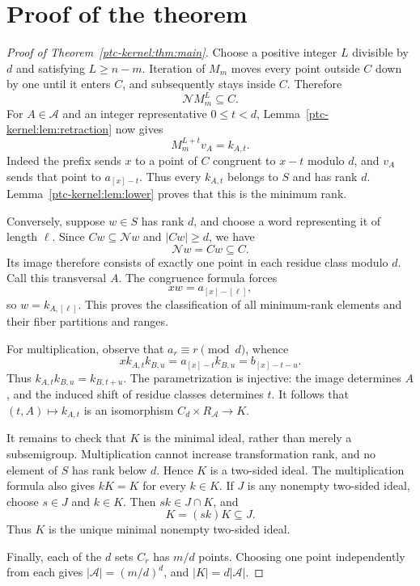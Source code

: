 
\section{Proof of the theorem}
\begin{proof}[Proof of Theorem~\ref{ptc-kernel:thm:main}]
Choose a positive integer $L$ divisible by $d$ and satisfying $L\ge n-m$.
Iteration of $M_m$ moves every point outside $C$ down by one until it
enters $C$, and subsequently stays inside $C$. Therefore
\[
 \mathcal N M_m^L\subseteq C.
\]
For $A\in\mathcal A$ and an integer representative $0\le t<d$,
Lemma~\ref{ptc-kernel:lem:retraction} now gives
\[
 M_m^{L+t}v_A=k_{A,t}.
\]
Indeed the prefix sends $x$ to a point of $C$ congruent to $x-t$
modulo $d$, and $v_A$ sends that point to $a_{[x]-t}$.
Thus every $k_{A,t}$ belongs to $S$ and has rank $d$.
Lemma~\ref{ptc-kernel:lem:lower} proves that this is the minimum rank.

Conversely, suppose $w\in S$ has rank $d$, and choose a word
representing it of length $\ell$. Since $Cw\subseteq\mathcal Nw$ and
$|Cw|\ge d$, we have
\[
 \mathcal Nw=Cw\subseteq C.
\]
Its image therefore consists of exactly one point in each residue
class modulo $d$. Call this transversal $A$. The congruence formula
forces
\[
 xw=a_{[x]-[\ell]},
\]
so $w=k_{A,[\ell]}$. This proves the classification of all minimum-rank
elements and their fiber partitions and ranges.

For multiplication, observe that $a_r\equiv r\pmod d$, whence
\[
 xk_{A,t}k_{B,u}=a_{[x]-t}k_{B,u}=b_{[x]-t-u}.
\]
Thus $k_{A,t}k_{B,u}=k_{B,t+u}$. The parametrization is injective:
the image determines $A$, and the induced shift of residue classes
determines $t$. It follows that $(t,A)\mapsto k_{A,t}$ is an
isomorphism $C_d\times R_{\mathcal A}\to K$.

It remains to check that $K$ is the minimal ideal, rather than merely
a subsemigroup. Multiplication cannot increase transformation rank,
and no element of $S$ has rank below $d$. Hence $K$ is a two-sided
ideal. The multiplication formula also gives $kK=K$ for every $k\in K$.
If $J$ is any nonempty two-sided ideal, choose $s\in J$ and $k\in K$.
Then $sk\in J\cap K$, and
\[
 K=(sk)K\subseteq J.
\]
Thus $K$ is the unique minimal nonempty two-sided ideal.

Finally, each of the $d$ sets $C_r$ has $m/d$ points. Choosing one
point independently from each gives $|\mathcal A|=(m/d)^d$, and
$|K|=d|\mathcal A|$.
\end{proof}
